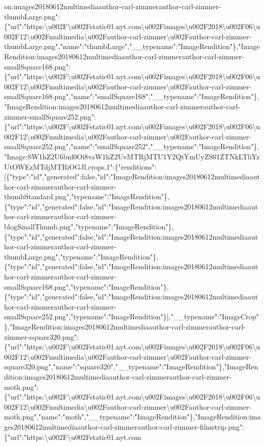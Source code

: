 on:images20180612multimediaauthor-carl-zimmerauthor-carl-zimmer-thumbLarge.png":\{"url":"https:\textbackslash{}u002F\textbackslash{}u002Fstatic01.nyt.com\textbackslash{}u002Fimages\textbackslash{}u002F2018\textbackslash{}u002F06\textbackslash{}u002F12\textbackslash{}u002Fmultimedia\textbackslash{}u002Fauthor-carl-zimmer\textbackslash{}u002Fauthor-carl-zimmer-thumbLarge.png","name":"thumbLarge","\_\_typename":"ImageRendition"\},"ImageRendition:images20180612multimediaauthor-carl-zimmerauthor-carl-zimmer-smallSquare168.png":\{"url":"https:\textbackslash{}u002F\textbackslash{}u002Fstatic01.nyt.com\textbackslash{}u002Fimages\textbackslash{}u002F2018\textbackslash{}u002F06\textbackslash{}u002F12\textbackslash{}u002Fmultimedia\textbackslash{}u002Fauthor-carl-zimmer\textbackslash{}u002Fauthor-carl-zimmer-smallSquare168.png","name":"smallSquare168","\_\_typename":"ImageRendition"\},"ImageRendition:images20180612multimediaauthor-carl-zimmerauthor-carl-zimmer-smallSquare252.png":\{"url":"https:\textbackslash{}u002F\textbackslash{}u002Fstatic01.nyt.com\textbackslash{}u002Fimages\textbackslash{}u002F2018\textbackslash{}u002F06\textbackslash{}u002F12\textbackslash{}u002Fmultimedia\textbackslash{}u002Fauthor-carl-zimmer\textbackslash{}u002Fauthor-carl-zimmer-smallSquare252.png","name":"smallSquare252","\_\_typename":"ImageRendition"\},"Image:SW1hZ2U6bnl0Oi8vaW1hZ2UvMTRjMTU1Y2QtYmUyZS01ZTNkLTliYzUtOWEzMTdjMTRiOGJl.crops.1":\{"renditions":{[}\{"type":"id","generated":false,"id":"ImageRendition:images20180612multimediaauthor-carl-zimmerauthor-carl-zimmer-thumbStandard.png","typename":"ImageRendition"\},\{"type":"id","generated":false,"id":"ImageRendition:images20180612multimediaauthor-carl-zimmerauthor-carl-zimmer-blogSmallThumb.png","typename":"ImageRendition"\},\{"type":"id","generated":false,"id":"ImageRendition:images20180612multimediaauthor-carl-zimmerauthor-carl-zimmer-thumbLarge.png","typename":"ImageRendition"\},\{"type":"id","generated":false,"id":"ImageRendition:images20180612multimediaauthor-carl-zimmerauthor-carl-zimmer-smallSquare168.png","typename":"ImageRendition"\},\{"type":"id","generated":false,"id":"ImageRendition:images20180612multimediaauthor-carl-zimmerauthor-carl-zimmer-smallSquare252.png","typename":"ImageRendition"\}{]},"\_\_typename":"ImageCrop"\},"ImageRendition:images20180612multimediaauthor-carl-zimmerauthor-carl-zimmer-square320.png":\{"url":"https:\textbackslash{}u002F\textbackslash{}u002Fstatic01.nyt.com\textbackslash{}u002Fimages\textbackslash{}u002F2018\textbackslash{}u002F06\textbackslash{}u002F12\textbackslash{}u002Fmultimedia\textbackslash{}u002Fauthor-carl-zimmer\textbackslash{}u002Fauthor-carl-zimmer-square320.png","name":"square320","\_\_typename":"ImageRendition"\},"ImageRendition:images20180612multimediaauthor-carl-zimmerauthor-carl-zimmer-moth.png":\{"url":"https:\textbackslash{}u002F\textbackslash{}u002Fstatic01.nyt.com\textbackslash{}u002Fimages\textbackslash{}u002F2018\textbackslash{}u002F06\textbackslash{}u002F12\textbackslash{}u002Fmultimedia\textbackslash{}u002Fauthor-carl-zimmer\textbackslash{}u002Fauthor-carl-zimmer-moth.png","name":"moth","\_\_typename":"ImageRendition"\},"ImageRendition:images20180612multimediaauthor-carl-zimmerauthor-carl-zimmer-filmstrip.png":\{"url":"https:\textbackslash{}u002F\textbackslash{}u002Fstatic01.nyt.com\textba